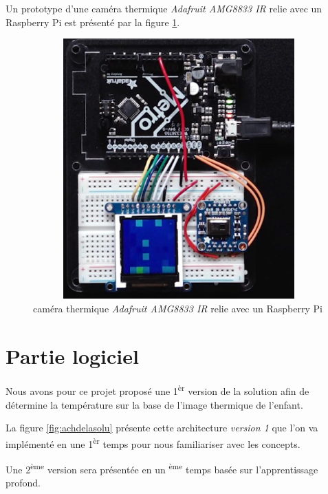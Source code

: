\documentclass[12pt]{article}
\begin{document}
\begin{itemize}
	
	Un prototype d'une caméra thermique \textit{Adafruit AMG8833 IR} relie avec un Raspberry Pi est présenté par la figure \ref{fig:raspther}.
	\newpage
	\begin{figure}[h]
				\centering
		\includegraphics[height=10cm,width=12cm]{img-Chapiter-3/therPi.png}
		\caption{caméra thermique \textit{Adafruit AMG8833 IR} relie avec un Raspberry Pi }
		\label{fig:raspther}
	\end{figure}
\end{itemize}

\section{Partie logiciel}
Nous avons pour ce projet proposé une 1\textsuperscript{èr} version de la solution afin de détermine la température sur la base de l'image thermique de l'enfant.

La figure \ref{fig:achdelasolu} présente cette architecture \textit{version 1} que l'on va implémenté en une 1\textsuperscript{èr} temps pour nous familiariser avec les concepts.

Une 2\textsuperscript{ème} version sera présentée en un \textsuperscript{ème} temps basée sur l'apprentissage profond.
\end{document}
